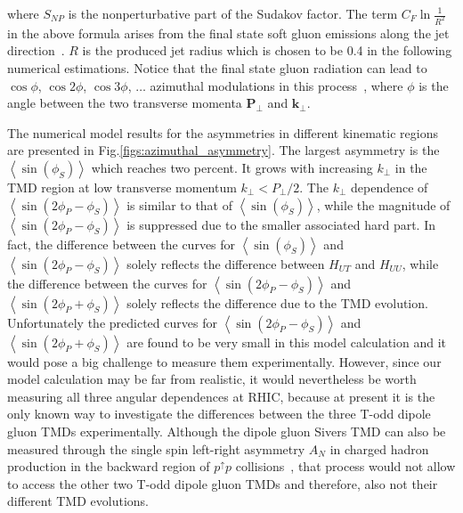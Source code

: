 \documentclass[prd,aps,preprintnumbers,fleqn,showpacs,nofootinbib,superscriptaddress]{revtex4}
\begin{document}
 where $S_{NP}$ is the nonperturbative part of the Sudakov factor. The term $C_F \ln \frac{1}{R^2}$  in the above formula arises from the final state soft gluon emissions along the jet direction~\cite{Banfi:2003jj,Sun:2014gfa,Catani:2014qha,Catani:2017tuc,Liu:2018trl,Chien:2019gyf,Chien:2020hzh,Hatta:2020bgy}.
 $R$ is the  produced jet radius which is chosen to be 0.4 in the following numerical estimations. Notice that the final state gluon radiation can lead to $\cos \phi$, $\cos 2 \phi$, $\cos 3\phi$, $\ldots$ azimuthal modulations in this process~\cite{Hatta:2021jcd}, where $\phi$ is the angle between the two transverse momenta $\bm{P}_\perp$ and $ \bm{k}_\perp$.


 The numerical model results for the asymmetries  in different kinematic regions are presented in Fig.\ref{figs:azimuthal_asymmetry}. The largest asymmetry is the $\left\langle \sin(\phi_S)\right\rangle$ which reaches two percent. It grows with increasing $k_\perp$ in the TMD region at low transverse momentum $k_\perp < P_\perp/2$. The $k_\perp$ dependence of $\left\langle \sin(2 \phi_P-\phi_S) \right\rangle$ 
 is similar to that of $\left\langle \sin(\phi_S)\right\rangle$, while the magnitude of  $\left\langle \sin(2 \phi_P-\phi_S) \right\rangle$ is suppressed due to the smaller associated hard part. In fact, the difference between the curves for $\left\langle \sin(\phi_S)\right\rangle$ and $\left\langle \sin(2 \phi_P-\phi_S) \right\rangle$ solely reflects the difference between $H_{UT}$ and $H_{UU}$, while the difference between the curves for $\left\langle \sin(2 \phi_P-\phi_S) \right\rangle$ and $\left\langle\sin(2 \phi_P+\phi_S) \right\rangle$ solely reflects the difference due to the TMD evolution. Unfortunately the predicted curves for $\left\langle \sin(2 \phi_P-\phi_S) \right\rangle$ and $\left\langle\sin(2 \phi_P+\phi_S) \right\rangle$ are found to be very small in this model calculation and it would pose a big challenge to measure them experimentally. However, since our model calculation may be far from realistic, it would nevertheless be worth measuring all three angular dependences at RHIC, because at present it is the only known way to investigate the differences between the three T-odd dipole gluon TMDs experimentally. Although the dipole gluon Sivers TMD can also be measured through the single spin left-right asymmetry $A_N$ in charged hadron production in the backward region of $p^\uparrow p$ collisions~\cite{Boer:2015pni}, that process would not allow to access the other two T-odd dipole gluon TMDs and therefore, also not their different TMD evolutions.
\end{document}
